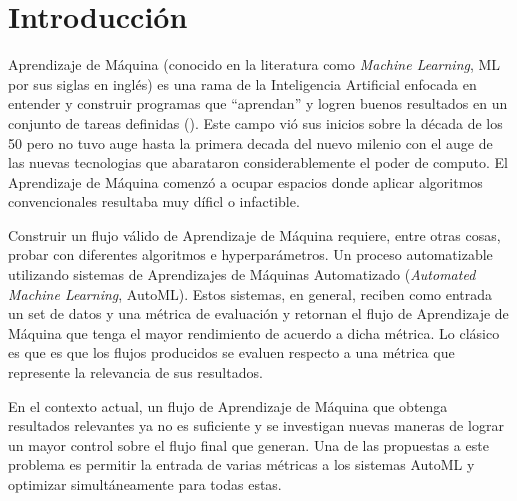 
\chapter*{Introducción}\label{chapter:introduction}

Aprendizaje de M\'aquina (conocido en la literatura como \textit{Machine Learning}, ML por sus siglas en ingl\'es) es una rama de la Inteligencia Artificial enfocada en entender y construir programas que ``aprendan'' y logren buenos resultados en un conjunto de tareas definidas (\cite{mitchell1990machine}). Este campo vi\'o sus inicios sobre la d\'ecada de los 50 pero no tuvo auge hasta la primera decada del nuevo milenio con el auge de las nuevas tecnologias que abarataron considerablemente el poder de computo. El Aprendizaje de M\'aquina comenz\'o a ocupar espacios donde aplicar algoritmos convencionales resultaba muy d\'ificl o infactible.

Construir un flujo v\'alido de Aprendizaje de M\'aquina requiere, entre otras cosas, probar con diferentes algoritmos e hyperpar\'ametros. Un proceso automatizable utilizando sistemas de Aprendizajes de M\'aquinas Automatizado (\textit{Automated Machine Learning}, AutoML).
Estos sistemas, en general, reciben como entrada un set de datos y una m\'etrica de evaluaci\'on y retornan el flujo de Aprendizaje de M\'aquina que tenga el mayor rendimiento de acuerdo a dicha m\'etrica. Lo cl\'asico es que es que los flujos producidos se evaluen respecto a una m\'etrica que represente la relevancia de sus resultados. 

En el contexto actual, un flujo de Aprendizaje de M\'aquina que obtenga resultados relevantes ya no es suficiente y se investigan nuevas maneras de lograr un mayor control sobre el flujo final que generan. Una de las propuestas a este problema es permitir la entrada de varias m\'etricas a los sistemas AutoML y optimizar simult\'aneamente para todas estas.  

